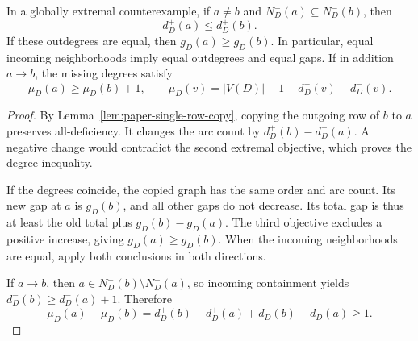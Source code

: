 \begin{proposition}
\label{prop:normal-degree}
In a globally extremal counterexample, if $a\ne b$ and
$N_D^-(a)\subseteq N_D^-(b)$, then
\[
 d_D^+(a)\leq d_D^+(b).
\]
If these outdegrees are equal, then $g_D(a)\geq g_D(b)$. In particular,
equal incoming neighborhoods imply equal outdegrees and equal gaps.
If in addition $a\to b$, the missing degrees satisfy
\[
 \mu_D(a)\geq\mu_D(b)+1,
 \qquad \mu_D(v)=|V(D)|-1-d_D^+(v)-d_D^-(v).
\]
\end{proposition}
\begin{proof}
By Lemma~\ref{lem:paper-single-row-copy}, copying the outgoing row
of $b$ to $a$ preserves all-deficiency. It changes the arc count by
$d_D^+(b)-d_D^+(a)$. A negative change would contradict the second
extremal objective, which proves the degree inequality.

If the degrees coincide, the copied graph has the same order and arc
count. Its new gap at $a$ is $g_D(b)$, and all other gaps do not
decrease. Its total gap is thus at least the old total plus
$g_D(b)-g_D(a)$. The third objective excludes a positive increase,
giving $g_D(a)\geq g_D(b)$. When the incoming neighborhoods are
equal, apply both conclusions in both directions.

If $a\to b$, then $a\in N_D^-(b)\setminus N_D^-(a)$, so incoming
containment yields $d_D^-(b)\geq d_D^-(a)+1$. Therefore
\[
 \mu_D(a)-\mu_D(b)
 =d_D^+(b)-d_D^+(a)+d_D^-(b)-d_D^-(a)\geq1.
\]
\end{proof}

